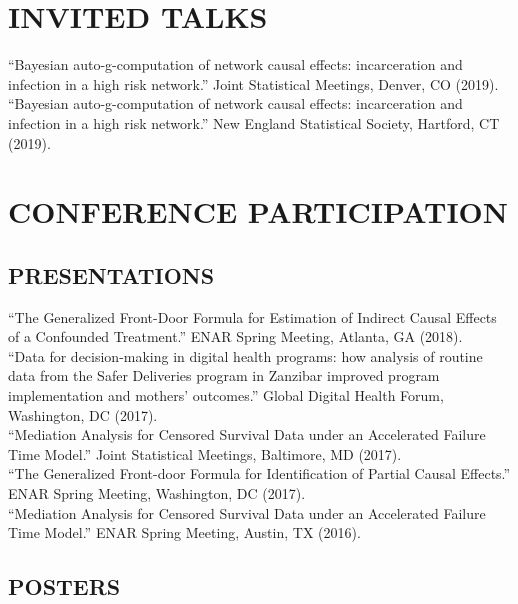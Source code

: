 \documentclass[12pt]{article}
\begin{document}
\section*{\textbf{{\large I}{NVITED} {\large T}{ALKS}}}   

``Bayesian auto-g-computation of network causal effects: incarceration and infection in a high risk network.'' Joint Statistical Meetings, Denver, CO (2019). \\

``Bayesian auto-g-computation of network causal effects: incarceration and infection in a high risk network.'' New England Statistical Society, Hartford, CT (2019). 

\section*{\textbf{{\large C}{ONFERENCE} {\large P}{ARTICIPATION}}}  

\subsection*{\textbf{PRESENTATIONS}}

``The Generalized Front-Door Formula for Estimation of Indirect Causal Effects of a Confounded Treatment.'' ENAR Spring Meeting, Atlanta, GA (2018). \\

``Data for decision-making in digital health programs: how analysis of routine data from the Safer Deliveries program in Zanzibar improved program implementation and mothers' outcomes.'' Global Digital Health Forum, Washington, DC (2017). \\

``Mediation Analysis for Censored Survival Data under an Accelerated Failure Time Model.'' Joint Statistical Meetings, Baltimore, MD (2017). \\

``The Generalized Front-door Formula for Identification of Partial Causal Effects.'' ENAR Spring Meeting, Washington, DC (2017). \\

``Mediation Analysis for Censored Survival Data under an Accelerated Failure Time Model.'' ENAR Spring Meeting, Austin, TX (2016). 

\subsection*{\textbf{POSTERS}}
\end{document}
